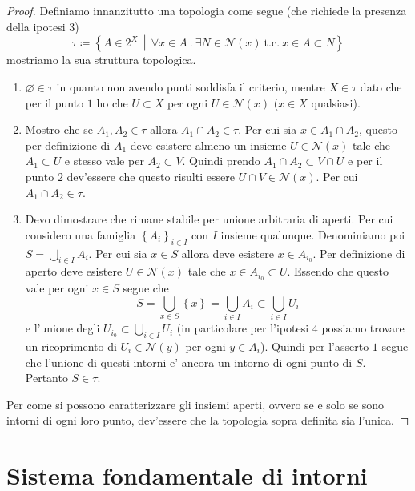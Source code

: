 \begin{proof}
	Definiamo innanzitutto una topologia come segue (che richiede la presenza della ipotesi $3$)
	\begin{equation*}
		\tau \coloneqq \left\{ A \in 2^X \,\middle|\, \forall x \in A\ . \ \exists N \in \mathcal{N}(x)\ \text{t.c.}\ x \in A \subset N \right\}
	\end{equation*}
	mostriamo la sua struttura topologica.
	\begin{enumerate}
		\item $\varnothing \in \tau$ in quanto non avendo punti soddisfa il criterio, mentre $X \in \tau$ dato che per il punto $1$ ho che $U \subset X$ per ogni $U \in \mathcal{N}(x)$ ($x \in X$ qualsiasi).
		\item Mostro che se $A_1, A_2 \in \tau$ allora $A_1 \cap A_2 \in \tau$. Per cui sia $x \in A_1 \cap A_2$, questo per definizione di $A_1$ deve esistere almeno un insieme $U \in \mathcal{N}(x)$ tale che $A_1\subset U$ e stesso vale per $A_2 \subset V$. Quindi prendo $A_1 \cap A_2 \subset V \cap U$ e per il punto $2$ dev'essere che questo risulti essere $U \cap V \in \mathcal{N}(x)$. Per cui $A_1 \cap A_2 \in \tau$.
		\item Devo dimostrare che rimane stabile per unione arbitraria di aperti. Per cui considero una famiglia $\left\{A_i\right\}_{i \in I}$ con $I$ insieme qualunque. Denominiamo poi $S = \bigcup_{i \in I} A_i$. Per cui sia $x \in S$ allora deve esistere $x \in A_{i_0}$. Per definizione di aperto deve esistere $U\in \mathcal{N}(x)$ tale che $x \in A_{i_0} \subset U$. Essendo che questo vale per ogni $x \in S$ segue che
		\begin{equation*}
			S = \bigcup_{x \in S} \left\{x\right\} = \bigcup_{i \in I} A_i \subset \bigcup_{i \in I} U_i
		\end{equation*}
		e l'unione degli $U_{i_0} \subset \bigcup_{i \in I} U_i$ (in particolare per l'ipotesi $4$ possiamo trovare un ricoprimento di $U_i \in \mathcal{N}(y)$ per ogni $y \in A_i$). Quindi per l'asserto $1$ segue che l'unione di questi intorni e' ancora un intorno di ogni punto di $S$. Pertanto $S \in \tau$.
	\end{enumerate}
	Per come si possono caratterizzare gli insiemi aperti, ovvero se e solo se sono intorni di ogni loro punto, dev'essere che la topologia sopra definita sia l'unica.  
\end{proof}

\section{Sistema fondamentale di intorni}


